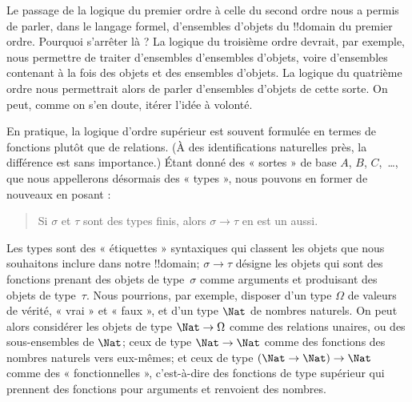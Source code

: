 \documentclass[../../../include/open-logic-section]{subfiles}
\begin{document}


Le passage de la logique du premier ordre à celle du second ordre
nous a permis de parler, dans le langage formel, d'ensembles d'objets
du !!{domain} du premier ordre. Pourquoi s'arrêter là ? La logique du
troisième ordre devrait, par exemple, nous permettre de traiter
d'ensembles d'ensembles d'objets, voire d'ensembles contenant à la
fois des objets et des ensembles d'objets. La logique du quatrième
ordre nous permettrait alors de parler d'ensembles d'objets de cette
sorte. On peut, comme on s'en doute, itérer l'idée à volonté.

En pratique, la logique d'ordre supérieur est souvent formulée en
termes de fonctions plutôt que de relations. (À des identifications
naturelles près, la différence est sans importance.) Étant donné des
« sortes » de base $A$, $B$, $C$,~\dots, que nous appellerons
désormais des « types », nous pouvons en former de nouveaux en posant :
\begin{quote}
Si $\sigma$ et $\tau$ sont des types finis, alors $\sigma \to \tau$
en est un aussi.
\end{quote}
Les types sont des « étiquettes » syntaxiques qui classent les objets
que nous souhaitons inclure dans notre !!{domain}; $\sigma \to \tau$
désigne les objets qui sont des fonctions prenant des objets de
type~$\sigma$ comme arguments et produisant des objets de type~$\tau$.
Nous pourrions, par exemple, disposer d'un type $\Omega$ de valeurs
de vérité, « vrai » et « faux », et d'un type $\Nat$ de nombres
naturels. On peut alors considérer les objets de type $\Nat \to
\Omega$ comme des relations unaires, ou des sous-ensembles de $\Nat$;
ceux de type $\Nat \to \Nat$ comme des fonctions des nombres naturels
vers eux-mêmes; et ceux de type $(\Nat \to \Nat) \to \Nat$ comme des
« fonctionnelles », c'est-à-dire des fonctions de type supérieur qui
prennent des fonctions pour arguments et renvoient des nombres.
\end{document}
